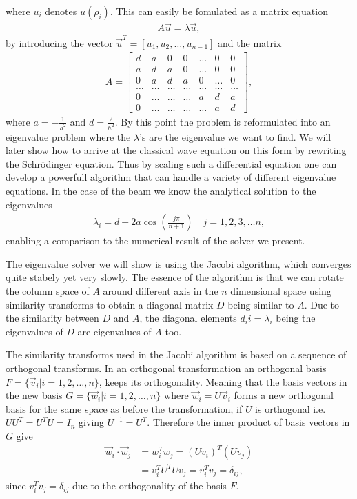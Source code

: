 \documentclass[twocolumn]{aastex62}
\begin{document}
where $u_i$ denotes $u(\rho_i)$. This can easily be fomulated as a matrix equation
\begin{align}
	A\vec{u} = \lambda\vec{u},
	\label{eq:matrix_eq}
\end{align}
by introducing the vector $\vec{u}^T = [u_1, u_2, \ldots, u_{n-1}]$ and the matrix
\begin{align}
A =
	\begin{bmatrix}
	d& a & 0   & 0    & \dots  &0     & 0 \\
    a & d & a & 0    & \dots  &0     &0 \\
    0   & a & d & a  &0       &\dots & 0\\
    \dots  & \dots & \dots & \dots  &\dots      &\dots & \dots\\
    0   & \dots & \dots & \dots  &a  &d & a\\
   0   & \dots & \dots & \dots  &\dots       &a & d
    \end{bmatrix} ,
\end{align}
where $a = -\frac{1}{h^2}$ and $d = \frac{2}{h^2}$.
By this point the problem is reformulated into an eigenvalue problem where the $\lambda$'s are the eigenvalue we want to find.
We will later show how to arrive at the classical wave equation on this form by rewriting the Schrödinger equation. Thus by scaling such a differential equation one can develop a powerfull algorithm that can handle a variety of different eigenvalue equations. In the case of the beam we know the analytical solution to the eigenvalues
\begin{align}\label{eq:analyticaleig}
	\lambda_i = d + 2a \cos\left(\frac{j\pi}{n+1}\right)\quad j = 1, 2, 3, \ldots n,
\end{align}
enabling a comparison to the numerical result of the solver we present.

The eigenvalue solver we will show is using the Jacobi algorithm, which converges quite stabely yet very slowly. The essence of the algorithm is that we can rotate the column space of $A$ around different axis in the $n$ dimensional space using similarity transforms to obtain a diagonal matrix $D$ being similar to $A$. Due to the similarity between $D$ and $A$, the diagonal elements $d_ii = \lambda_i$ being the eigenvalues of $D$ are eigenvalues of $A$ too.

The similarity transforms used in the Jacobi algorithm is based on a sequence of orthogonal transforms. In an orthogonal transformation an orthogonal basis $F = \{\vec{v}_i | i = 1, 2, \ldots, n\}$, keeps its orthogonality. Meaning that the basis vectors in the new basis $G = \{\vec{w}_i | i = 1, 2, \ldots, n\}$ where $\vec{w}_i = U\vec{v}_i$ forms a new orthogonal basis for the same space as before the transformation, if $U$ is orthogonal i.e. $UU^T = U^TU = I_n$ giving $U^{-1} = U^T$. Therefore the inner product of basis vectors in $G$ give
\begin{align}
	\vec{w}_i\cdot \vec{w}_j &= w_i^Tw_j = (Uv_i)^T(Uv_j) \\
	&= v_i^TU^TUv_j = v_i^Tv_j = \delta_{ij},
\end{align}
since $v_i^Tv_j = \delta_{ij}$ due to the orthogonality of the basis $F$.
\end{document}

